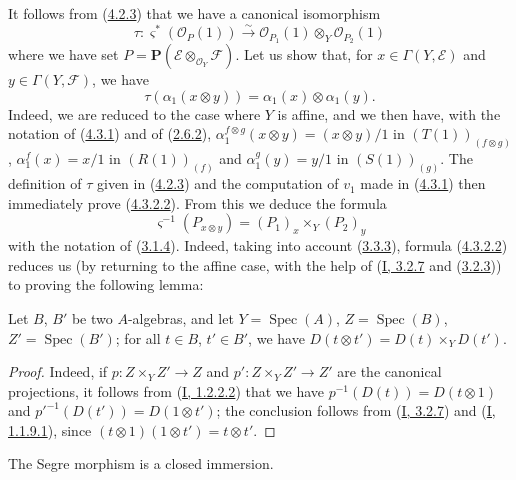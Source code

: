 \begin{env}[4.3.2]
\label{II.4.3.2}
It follows from (\hyperref[II.4.2.3]{4.2.3}) that we have a canonical
isomorphism
\[
\label{II.4.3.2.1}
  \tau:\varsigma^*(\mathcal{O}_P(1))\xrightarrow{\sim}
  \mathcal{O}_{P_1}(1)\otimes_Y\mathcal{O}_{P_2}(1)
\tag{4.3.2.1}
\]
where we have set
$P=\mathbf{P}(\mathcal{E}\otimes_{\mathcal{O}_Y}\mathcal{F})$. Let us show
that, for $x\in\Gamma(Y,\mathcal{E})$ and
$y\in\Gamma(Y,\mathcal{F})$, we have
\[
\label{II.4.3.2.2}
  \tau(\alpha_1(x\otimes y))=\alpha_1(x)\otimes\alpha_1(y).
\tag{4.3.2.2}
\]
Indeed, we are reduced to the case where $Y$ is affine, and we then have, with
the notation of (\hyperref[II.4.3.1]{4.3.1}) and of
(\hyperref[II.2.6.2]{2.6.2}),
$\alpha_1^{f\otimes g}(x\otimes y)=(x\otimes y)/1$ in
$(T(1))_{(f\otimes g)}$, $\alpha_1^f(x)=x/1$ in $(R(1))_{(f)}$ and
$\alpha_1^g(y)=y/1$ in $(S(1))_{(g)}$. The definition of $\tau$ given in
(\hyperref[II.4.2.3]{4.2.3}) and the computation of $v_1$ made in
(\hyperref[II.4.3.1]{4.3.1}) then immediately prove
(\hyperref[II.4.3.2.2]{4.3.2.2}). From this we deduce the formula
\[
\label{II.4.3.2.3}
  \varsigma^{-1}(P_{x\otimes y})=(P_1)_x\times_Y(P_2)_y
\tag{4.3.2.3}
\]
with the notation of (\hyperref[II.3.1.4]{3.1.4}). Indeed, taking into account
(\hyperref[II.3.3.3]{3.3.3}), formula
(\hyperref[II.4.3.2.2]{4.3.2.2}) reduces us (by returning to the affine case,
with the help of (\hyperref[I.3.2.7]{I, 3.2.7} and
(\hyperref[I.3.2.3]{3.2.3})) to proving the following lemma:

\begin{lemma}[4.3.2.4]
\label{II.4.3.2.4}
Let $B$, $B'$ be two $A$-algebras, and let
$Y=\operatorname{Spec}(A)$, $Z=\operatorname{Spec}(B)$,
$Z'=\operatorname{Spec}(B')$; for all $t\in B$, $t'\in B'$, we have
$D(t\otimes t')=D(t)\times_YD(t')$.
\end{lemma}

\begin{proof}
Indeed, if $p:Z\times_YZ'\to Z$ and $p':Z\times_YZ'\to Z'$ are the
canonical projections, it follows from
(\hyperref[I.1.2.2.2]{I, 1.2.2.2}) that we have
$p^{-1}(D(t))=D(t\otimes1)$ and
$p'^{-1}(D(t'))=D(1\otimes t')$; the conclusion follows from
(\hyperref[I.3.2.7]{I, 3.2.7}) and
(\hyperref[I.1.1.9.1]{I, 1.1.9.1}), since
$(t\otimes1)(1\otimes t')=t\otimes t'$.
\end{proof}
\end{env}

\begin{proposition}[4.3.3]
\label{II.4.3.3}
The Segre morphism is a closed immersion.
\end{proposition}

